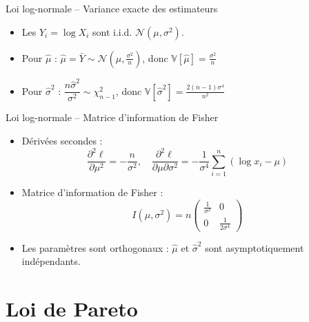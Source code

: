 \documentclass[11pt,aspectratio=169]{beamer}
\begin{document}
\begin{frame}{Loi log-normale -- Variance exacte des estimateurs}

\begin{itemize}

\item Les $Y_i = \log X_i$ sont i.i.d. $\mathcal{N}(\mu, \sigma^2)$.\newline

\item Pour $\hat{\mu}$ : $\hat{\mu} = \bar{Y} \sim \mathcal{N}\left(\mu, \frac{\sigma^2}{n}\right)$, donc $\boxed{\mathbb{V}[\hat{\mu}] = \frac{\sigma^2}{n}}$\newline

\item Pour $\hat{\sigma}^2$ : $\dfrac{n\hat{\sigma}^2}{\sigma^2} \sim \chi^2_{n-1}$, donc $\boxed{\mathbb{V}[\hat{\sigma}^2] = \frac{2(n-1)\sigma^4}{n^2}}$

\end{itemize}

\end{frame}

\begin{frame}{Loi log-normale -- Matrice d'information de Fisher}

\begin{itemize}

\item Dérivées secondes :
  \[
  \frac{\partial^2 \ell}{\partial \mu^2} = -\frac{n}{\sigma^2}, \quad \frac{\partial^2 \ell}{\partial \mu \partial \sigma^2} = -\frac{1}{\sigma^4}\sum_{i=1}^n (\log x_i - \mu)
  \]

\item Matrice d'information de Fisher :
  \[
  \boxed{I(\mu, \sigma^2) = n \begin{pmatrix} \frac{1}{\sigma^2} & 0 \\ 0 & \frac{1}{2\sigma^4} \end{pmatrix}}
  \]

\item Les paramètres sont orthogonaux : $\hat{\mu}$ et $\hat{\sigma}^2$ sont asymptotiquement indépendants.

\end{itemize}

\end{frame}

\section{Loi de Pareto}
\end{document}
